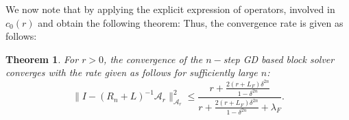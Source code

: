 \documentclass{article}
\newtheorem{theorem}{Theorem}
\theoremstyle{definition}
\begin{document}
We now note that by applying the explicit expression of operators, involved in $c_0(r)$ and obtain the following theorem:  
Thus, the convergence rate is given as follows: 
\begin{theorem}
For $r > 0$, the convergence of the $n-$step GD based block solver converges with the rate given as follows for sufficiently large $n$: 
\begin{equation}
\|I - (R_n + L)^{-1} \mathcal{A}_r\|_{\mathcal{A}_r}^2 \leq \frac{r +  \frac{ 2 (r + L_F) \delta^{2n}}{1 - \delta^{2n}} }{r + \frac{ 2 (r + L_F)\delta^{2n}}{1 - \delta^{2n}} + \lambda_F}. 
\end{equation} 
\end{theorem} 
\end{document}
